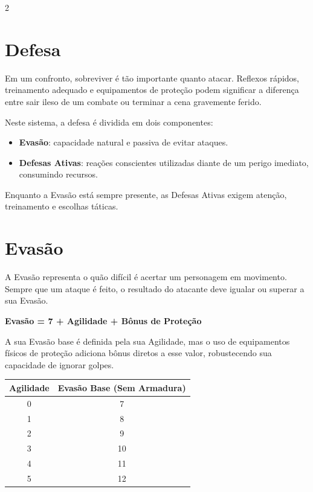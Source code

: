 \documentclass[a4paper,11pt,openany]{book}
\begin{document}
\begin{multicols}{2}

\section{Defesa}

Em um confronto, sobreviver é tão importante quanto atacar. Reflexos rápidos, treinamento adequado e equipamentos de proteção podem significar a diferença entre sair ileso de um combate ou terminar a cena gravemente ferido.

Neste sistema, a defesa é dividida em dois componentes:
\begin{itemize}
\item \textbf{Evasão}: capacidade natural e passiva de evitar ataques.
\item \textbf{Defesas Ativas}: reações conscientes utilizadas diante de um perigo imediato, consumindo recursos.
\end{itemize}

Enquanto a Evasão está sempre presente, as Defesas Ativas exigem atenção, treinamento e escolhas táticas.

\section{Evasão}

A Evasão representa o quão difícil é acertar um personagem em movimento. Sempre que um ataque é feito, o resultado do atacante deve igualar ou superar a sua Evasão.

\begin{regra}
\centering
\Large\bfseries Evasão = 7 + Agilidade + Bônus de Proteção
\end{regra}

A sua Evasão base é definida pela sua Agilidade, mas o uso de equipamentos físicos de proteção adiciona bônus diretos a esse valor, robustecendo sua capacidade de ignorar golpes.

\begin{table}[H]
\centering
\sffamily
{}
\begin{tabular}{cc}
\toprule
\textbf{Agilidade} & \textbf{Evasão Base (Sem Armadura)} \\
\midrule
0 & 7 \\
1 & 8 \\
2 & 9 \\
3 & 10 \\
4 & 11 \\
5 & 12 \\
\bottomrule
\end{tabular}
\end{table}


\end{multicols}
\end{document}
